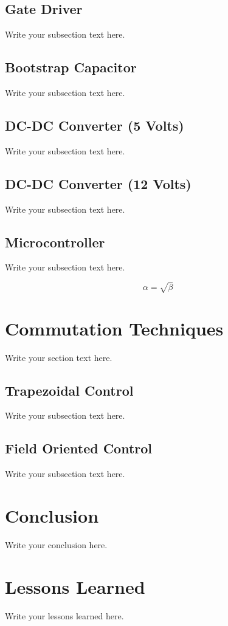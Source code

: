 \documentclass{article}
\begin{document}
		\subsection{Gate Driver}
		Write your subsection text here.
	
		\subsection{Bootstrap Capacitor}
		Write your subsection text here.
	
		\subsection{DC-DC Converter (5 Volts)}
		Write your subsection text here.
	
		\subsection{DC-DC Converter (12 Volts)}
		Write your subsection text here.
	
		\subsection{Microcontroller}
		Write your subsection text here.
	
		\begin{equation}
		\label{simple_equation}
		\alpha = \sqrt{ \beta }
		\end{equation}
	
	\section{Commutation Techniques}
	Write your section text here.
	
		\subsection{Trapezoidal Control}
		Write your subsection text here.
		
		\subsection{Field Oriented Control}
		Write your subsection text here.
	
	\section{Conclusion}
	Write your conclusion here.
	
	\section{Lessons Learned}
	Write your lessons learned here.
	
	
\end{document}

